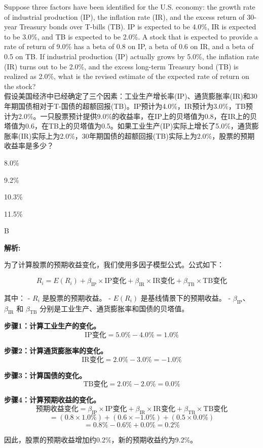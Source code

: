 \documentclass{article}
\newcounter{question} %
\newenvironment{explanation}
{\textbf{解析:}\par}
{\par}
\begin{document}
\begin{question}
    Suppose three factors have been identified for the U.S. economy: the growth rate of industrial production (IP), the inflation rate (IR), and the excess return of 30-year Treasury bonds over T-bills (TB). IP is expected to be 4.0\%, IR is expected to be 3.0\%, and TB is expected to be 2.0\%. A stock that is expected to provide a rate of return of 9.0\% has a beta of 0.8 on IP, a beta of 0.6 on IR, and a beta of 0.5 on TB. If industrial production (IP) actually grows by 5.0\%, the inflation rate (IR) turns out to be 2.0\%, and the excess long-term Treasury bond (TB) is realized as 2.0\%, what is the revised estimate of the expected rate of return on the stock?
    \\    假设美国经济中已经确定了三个因素：工业生产增长率(IP)、通货膨胀率(IR)和30年期国债相对于T-国债的超额回报(TB)。IP预计为4.0\%，IR预计为3.0\%，TB预计为2.0\%。一只股票预计提供9.0\%的收益率，在IP上的贝塔值为0.8，在IR上的贝塔值为0.6，在TB上的贝塔值为0.5。如果工业生产(IP)实际上增长了5.0\%，通货膨胀率(IR)实际上为2.0\%，30年期国债的超额回报(TB)实际上为2.0\%，股票的预期收益率是多少？
\end{question}

\begin{choices}
    \item 8.0\%
    \item 9.2\%
    \item 10.3\%
    \item 11.5\%
\end{choices}

\begin{correctanswer}
    B
\end{correctanswer}

\begin{explanation}
    为了计算股票的预期收益变化，我们使用多因子模型公式。公式如下：

    \[
    R_i = E(R_i) + \beta_{\text{IP}} \times \text{IP变化} + \beta_{\text{IR}} \times \text{IR变化} + \beta_{\text{TB}} \times \text{TB变化}
    \]

    其中：
    - \(R_i\) 是股票的预期收益。
    - \(E(R_i)\) 是基线情景下的预期收益。
    - \(\beta_{\text{IP}}\)、\(\beta_{\text{IR}}\) 和 \(\beta_{\text{TB}}\) 分别是工业生产、通货膨胀率和国债的贝塔值。

    \textbf{步骤1：计算工业生产的变化。}
    \[
    \text{IP变化} = 5.0\% - 4.0\% = 1.0\%
    \]

    \textbf{步骤2：计算通货膨胀率的变化。}
    \[
    \text{IR变化} = 2.0\% - 3.0\% = -1.0\%
    \]

    \textbf{步骤3：计算国债的变化。}
    \[
    \text{TB变化} = 2.0\% - 2.0\% = 0.0\%
    \]

    \textbf{步骤4：计算预期收益的变化。}
    \[
    \text{预期收益变化} = \beta_{\text{IP}} \times \text{IP变化} + \beta_{\text{IR}} \times \text{IR变化} + \beta_{\text{TB}} \times \text{TB变化}
    \]
    \[
    = (0.8 \times 1.0\%) + (0.6 \times -1.0\%) + (0.5 \times 0.0\%)
    \]
    \[
    = 0.8\% - 0.6\% + 0.0\% = 0.2\%
    \]

    因此，股票的预期收益增加约0.2\%，新的预期收益约为9.2\%。
\end{explanation}
\end{document}
